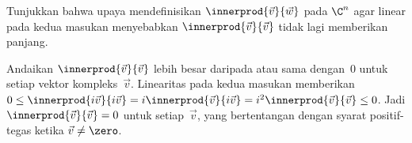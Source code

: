 \begin{exercises}
%
\item
Tunjukkan bahwa upaya mendefinisikan $\innerprod{\vec{v}}{\vec{w}}$ pada
$\C^n$ agar linear pada kedua masukan menyebabkan
$\innerprod{\vec{v}}{\vec{v}}$ tidak lagi memberikan panjang.
\begin{answer}
Andaikan $\innerprod{\vec{v}}{\vec{v}}$ lebih besar daripada atau sama
dengan~$0$ untuk setiap vektor kompleks~$\vec{v}$.
Linearitas pada kedua masukan memberikan
$0\leq \innerprod{i\vec{v}}{i\vec{v}}
  =i\innerprod{\vec{v}}{i\vec{v}}
  =i^2\innerprod{\vec{v}}{\vec{v}}\leq 0$.
Jadi $\innerprod{\vec{v}}{\vec{v}}=0$ untuk setiap~$\vec{v}$, yang bertentangan
dengan syarat positif-tegas ketika $\vec{v}\neq\zero$.
\end{answer}





\end{exercises}
\endinput
% 
